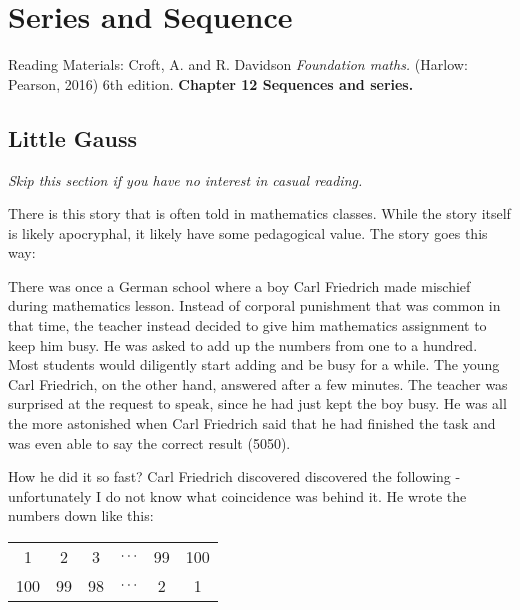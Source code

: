 \chapter{Series and Sequence}
Reading Materials: \newline
Croft, A. and R. Davidson \textit{Foundation maths.} (Harlow: Pearson, 2016) 6th edition. \textbf{Chapter 12 Sequences and series.}
\section{Little Gauss}
\noindent \textit{Skip this section if you have no interest in casual reading.}

\vspace{5mm} %

\noindent There is this story that is often told in mathematics classes. While the story itself is likely apocryphal, it likely have some pedagogical value. The story goes this way:

\vspace{5mm} %

\noindent There was once a German school where a boy Carl Friedrich made mischief during mathematics lesson. Instead of corporal punishment that was common in that time, the teacher instead decided to give him mathematics assignment to keep him busy. He was asked to add up the numbers from one to a hundred. Most students would diligently start adding and be busy for a while. The young Carl Friedrich, on the other hand, answered after a few minutes. The teacher was surprised at the request to speak, since he had just kept the boy busy. He was all the more astonished when Carl Friedrich said that he had finished the task and was even able to say the correct result (5050).

\vspace{5mm} %


\vspace{5mm} %

\noindent How he did it so fast? Carl Friedrich discovered discovered the following - unfortunately I do not know what coincidence was behind it. He wrote the numbers down like this:

\begin{center}
	\begin{tabular}{cccccc}
		1   & 2  & 3  & $\mathellipsis$ & 99 & 100 \\
		100 & 99 & 98 & $\mathellipsis$ & 2  & 1  
	\end{tabular}
\end{center}

